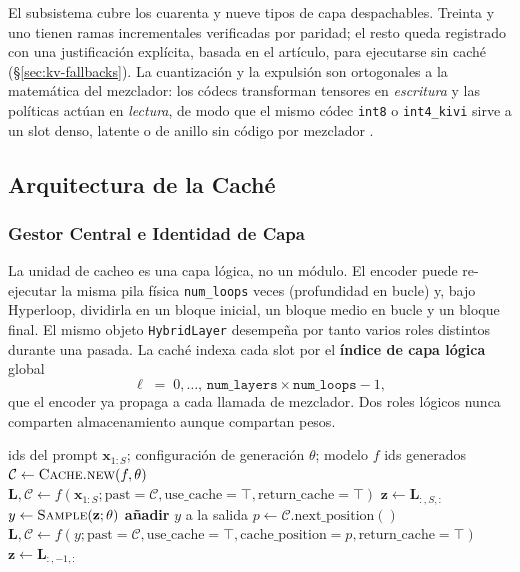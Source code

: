 El subsistema cubre los cuarenta y nueve tipos de capa despachables. Treinta y uno tienen ramas incrementales verificadas por paridad; el resto queda registrado con una justificación explícita, basada en el artículo, para ejecutarse sin caché (\S\ref{sec:kv-fallbacks}). La cuantización y la expulsión son ortogonales a la matemática del mezclador: los códecs transforman tensores en \emph{escritura} y las políticas actúan en \emph{lectura}, de modo que el mismo códec \texttt{int8} o \texttt{int4\_kivi} sirve a un slot denso, latente o de anillo sin código por mezclador \citep{kivi_liu_2024,kvquant_hooper_2024,skvq_duanmu_2024}.

\subsection{Arquitectura de la Caché}
\label{sec:kv-architecture}

\subsubsection{Gestor Central e Identidad de Capa}

La unidad de cacheo es una capa lógica, no un módulo. El encoder puede re-ejecutar la misma pila física \texttt{num\_loops} veces (profundidad en bucle) y, bajo Hyperloop, dividirla en un bloque inicial, un bloque medio en bucle y un bloque final. El mismo objeto \texttt{HybridLayer} desempeña por tanto varios roles distintos durante una pasada. La caché indexa cada slot por el \textbf{índice de capa lógica} global
\[
\ell \;=\; 0,\dots,\, \texttt{num\_layers}\times\texttt{num\_loops}-1 ,
\]
que el encoder ya propaga a cada llamada de mezclador. Dos roles lógicos nunca comparten almacenamiento aunque compartan pesos.

\begin{algorithm}[H]
\caption{Bucle de generación con caché (prefill + decodificación)}
\begin{algorithmic}[1]
\Require ids del prompt $\mathbf{x}_{1:S}$; configuración de generación $\theta$; modelo $f$
\Ensure ids generados
\State $\mathcal{C} \gets \textsc{Cache.new}(f,\theta)$ 
\State $\mathbf{L}, \mathcal{C} \gets f(\mathbf{x}_{1:S}; \text{past}=\mathcal{C}, \text{use\_cache}=\top, \text{return\_cache}=\top)$ 
\State $\mathbf{z} \gets \mathbf{L}_{:,S,:}$
    \State $y \gets \textsc{Sample}(\mathbf{z};\theta)$ 
    \State \textbf{añadir} $y$ a la salida
        \State $p \gets \mathcal{C}.\text{next\_position}()$
        \State $\mathbf{L}, \mathcal{C} \gets f(y; \text{past}=\mathcal{C}, \text{use\_cache}=\top, \text{cache\_position}=p, \text{return\_cache}=\top)$
        \State $\mathbf{z} \gets \mathbf{L}_{:,-1,:}$
    \EndIf
\EndFor
\end{algorithmic}
\end{algorithm}


